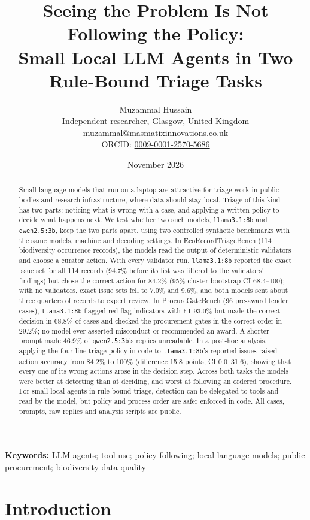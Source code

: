 \documentclass[11pt,a4paper]{article}
\title{\textbf{Seeing the Problem Is Not Following the Policy:\\Small Local LLM Agents in Two Rule-Bound Triage Tasks}}
\author{Muzammal Hussain\\
\small Independent researcher, Glasgow, United Kingdom\\
\small \href{mailto:muzammal@masmatixinnovations.co.uk}{muzammal@masmatixinnovations.co.uk}\\
\small ORCID: \href{https://orcid.org/0009-0001-2570-5686}{0009-0001-2570-5686}}
\date{\small November 2026}
\newcommand{\code}[1]{\texttt{#1}}
\begin{document}
\maketitle

\begin{abstract}
\noindent
Small language models that run on a laptop are attractive for triage work in public bodies and research
infrastructure, where data should stay local. Triage of this kind has two parts: noticing what is wrong
with a case, and applying a written policy to decide what happens next. We test whether two such models,
\code{llama3.1:8b} and \code{qwen2.5:3b}, keep the two parts apart, using two controlled synthetic benchmarks
with the same models, machine and decoding settings. In EcoRecordTriageBench (114 biodiversity occurrence
records), the models read the output of deterministic validators and choose a curator action. With every
validator run, \code{llama3.1:8b} reported the exact issue set for all 114 records (94.7\% before its list was filtered to
the validators' findings) but chose the correct action
for 84.2\% (95\% cluster-bootstrap CI 68.4--100); with no validators, exact issue sets fell to 7.0\% and
9.6\%, and both models sent about three quarters of records to expert review. In ProcureGateBench (96 pre-award
tender cases), \code{llama3.1:8b} flagged red-flag indicators with F1 93.0\% but made the correct decision in
68.8\% of cases and checked the procurement gates in the correct order in 29.2\%; no model ever asserted
misconduct or recommended an award. A shorter prompt made 46.9\% of \code{qwen2.5:3b}'s replies unreadable. In a
post-hoc analysis, applying the four-line triage policy in code to \code{llama3.1:8b}'s reported issues raised
action accuracy from 84.2\% to 100\% (difference 15.8 points, CI 0.0--31.6), showing that every one of its wrong
actions arose in the decision step. Across both tasks the models were
better at detecting than at deciding, and worst at following an ordered procedure. For small local agents in
rule-bound triage, detection can be delegated to tools and read by the model, but policy and process order are
safer enforced in code. All cases, prompts, raw replies and analysis scripts are public.
\end{abstract}

\noindent\textbf{Keywords:} LLM agents; tool use; policy following; local language models; public procurement; biodiversity data quality

\section{Introduction}
\end{document}
